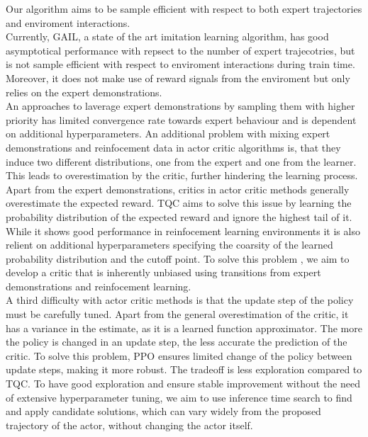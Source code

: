 Our algorithm aims to be sample efficient with respect to both expert trajectories and enviroment interactions. \\

Currently, GAIL, a state of the art imitation learning algorithm, has good asymptotical performance with repsect to the number of expert trajecotries, but is not sample efficient 
with respect to enviroment interactions during train time. Moreover, it does not make use of reward signals from the enviroment but only relies on the expert demonstrations.\\ 

An approaches to laverage expert demonstrations by sampling them with higher priority \cite{vecerik2018leveraging} has limited convergence rate towards expert behaviour and is dependent on additional hyperparameters. 
An additional problem with mixing expert demonstrations and reinfocement data in actor critic algorithms is, that they induce two different distributions, one from the expert and one from 
the learner. This leads to overestimation by the critic, further hindering the learning process. \\

Apart from the expert demonstrations, critics in actor critic methods generally overestimate the expected reward. TQC \cite{TQC_Paper} aims to solve this issue by learning the 
probability distribution of the expected reward and ignore the highest tail of it. While it shows good performance in reinfocement learning environments 
it is also relient on additional hyperparameters 
specifying the coarsity of the learned probability distribution and the cutoff point. To solve this problem , we aim to develop a critic that is inherently unbiased using transitions from expert demonstrations 
and reinfocement learning.\\

A third difficulty with actor critic methods is that the update step of the policy must be carefully tuned. Apart from the general overestimation of the critic, it has a variance in the estimate, 
as it is a learned function approximator. The more the policy is changed in an update step, the less accurate the prediction of the critic. To solve this problem, PPO ensures limited change of the policy 
between update steps, making it more robust. The tradeoff is less exploration compared to TQC. To have good exploration 
and ensure stable improvement without the need of extensive hyperparameter tuning, we aim to use inference time search to find and apply candidate solutions, which can vary widely from the 
proposed trajectory of the actor, without changing the actor itself. \\


